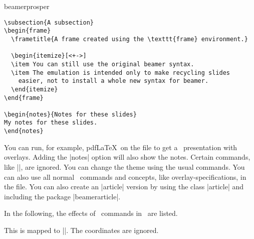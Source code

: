 \begin{package}{{beamerprosper}}
\begin{verbatim}
\subsection{A subsection}
\begin{frame}
  \frametitle{A frame created using the \texttt{frame} environment.}

  \begin{itemize}[<+->]
  \item You can still use the original beamer syntax.
  \item The emulation is intended only to make recycling slides
    easier, not to install a whole new syntax for beamer.
  \end{itemize}
\end{frame}

\begin{notes}{Notes for these slides}
My notes for these slides.
\end{notes}

\end{verbatim}
  You can run, for example, pdf\LaTeX\ on the file to get a \beamer\ presentation with overlays. Adding the |notes| option will also show the notes. Certain commands, like |\LeftFoot|, are ignored. You can change the theme using the usual commands. You can also use all normal \beamer\ commands and concepts, like overlay-specifications, in the file. You can also create an |article| version by using the class |article| and including the package |beamerarticle|.
\end{package}

In the following, the effects of \prosper\ commands in \beamer\ are listed.



\begin{command}{\Logo{}}
  This is mapped to ||. The coordinates are ignored.
\end{command}

